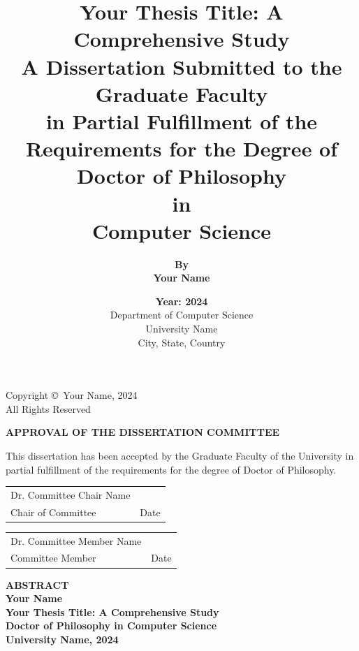 \documentclass[12pt]{report}
\title{
  \fontsize{16pt}{\baselineskip}\textbf{Your Thesis Title: A Comprehensive Study}\\[2cm]
  \fontsize{14pt}{\baselineskip}A Dissertation Submitted to the Graduate Faculty\\
  in Partial Fulfillment of the Requirements for the Degree of\\[0.5cm]
  \fontsize{14pt}{\baselineskip}\textbf{Doctor of Philosophy}\\[0.5cm]
  \fontsize{12pt}{\baselineskip}in\\[0.5cm]
  \fontsize{12pt}{\baselineskip}\textbf{Computer Science}
}
\author{
  \fontsize{14pt}{\baselineskip}\textbf{By}\\[0.5cm]
  \fontsize{14pt}{\baselineskip}\textbf{Your Name}\\[2cm]
}
\date{
  \fontsize{12pt}{\baselineskip}\textbf{Year: 2024}\\[1cm]
  \fontsize{12pt}{\baselineskip}Department of Computer Science\\
  University Name\\
  City, State, Country
}
\theoremstyle{dissertation}
\newtheorem theorem}{Theorem}
\newtheorem definition}{Definition}
\newtheorem lemma}{Lemma}
\newtheorem proposition}{Proposition}
\newtheorem corollary}{Corollary}
\begin{document}
\frontmatter
{}

\maketitle

\thispagestyle{empty}
\vspace*{\fill}
\begin{center}
Copyright \copyright\ Your Name, 2024\\
All Rights Reserved
\end{center}
\vspace*{\fill}
\clearpage

\thispagestyle{empty}
\vspace*{3cm}
\begin{center}
\textbf{APPROVAL OF THE DISSERTATION COMMITTEE}
\end{center}
\vspace{1cm}

\begin{center}
This dissertation has been accepted by the Graduate Faculty of the University in partial fulfillment of the requirements for the degree of Doctor of Philosophy.
\end{center}

\vspace{2cm}

\begin{center}
\begin{tabular}{lr}
\hline
Dr. Committee Chair Name & \hspace{2in} \\
Chair of Committee & Date \\
\end{tabular}
\end{center}

\vspace{1cm}

\begin{center}
\begin{tabular}{lr}
\hline
Dr. Committee Member Name & \hspace{2in} \\
Committee Member & Date \\
\end{tabular}
\end{center}

\clearpage

\begin{center}
\textbf{ABSTRACT}\\[1cm]
\textbf{Your Name}\\
\textbf{Your Thesis Title: A Comprehensive Study}\\[0.5cm]
\textbf{Doctor of Philosophy in Computer Science}\\[0.5cm]
\textbf{University Name, 2024}
\end{center}
\end{document}
